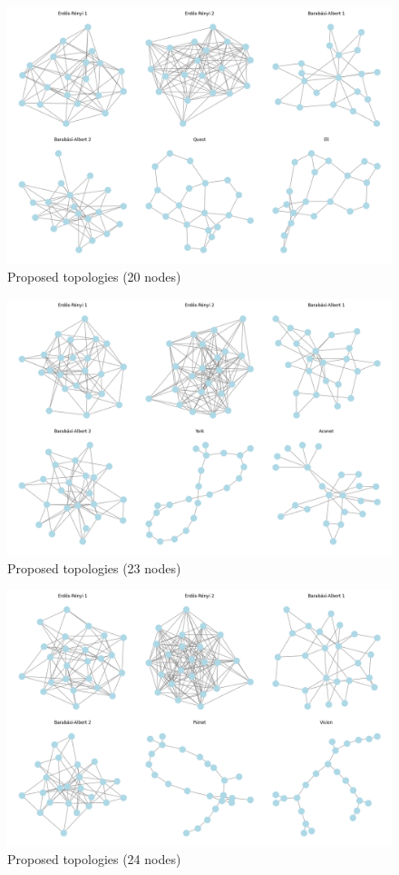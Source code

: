 \begin{figure}
    \centering
    \includegraphics[width=0.8\linewidth]{images/Topology set/20.png}
    \caption{Proposed topologies (20 nodes)}
    \label{fig:20_prop}
\end{figure}

\begin{figure}
    \centering
    \includegraphics[width=0.8\linewidth]{images/Topology set/23.png}
    \caption{Proposed topologies (23 nodes)}
    \label{fig:23_prop}
\end{figure}

\begin{figure}
    \centering
    \includegraphics[width=0.8\linewidth]{images/Topology set/24.png}
    \caption{Proposed topologies (24 nodes)}
    \label{fig:24_prop}
\end{figure}

